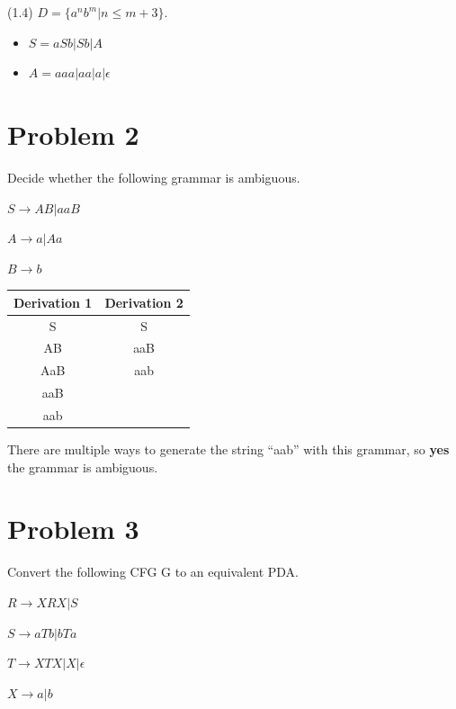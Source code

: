 \documentclass[11pt]{article}
\begin{document}
(1.4) $D=\{a^nb^m|n\leq m+3\}$.

\begin{itemize}
\item $S = aSb | Sb | A $
\item $A = aaa | aa | a | \epsilon$

\end{itemize}



\newpage
\section*{Problem 2}

\noindent
Decide whether the following grammar is ambiguous.
\newline

$S\rightarrow AB|aaB$

$A\rightarrow a|Aa$

$B\rightarrow b$


\begin{table}[h!]
\begin{tabular}{c | c}
Derivation 1 & Derivation 2\\
\hline
S & S\\
AB & aaB\\
AaB & aab\\
aaB & \\
aab & \\
\end{tabular}

\end{table}


There are multiple ways to generate the string ``aab'' with this grammar, so \textbf{yes} the grammar is ambiguous.

\newpage
\section*{Problem 3}

\noindent
Convert the following CFG G to an equivalent PDA.

$R\rightarrow XRX|S$

$S\rightarrow aTb|bTa$

$T\rightarrow XTX|X|\epsilon$

$X\rightarrow a|b$
\end{document}
